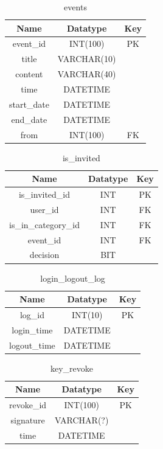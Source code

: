 \begin{table}[!ht]
\caption{events}
\centering
\begin{tabular}{c c c}
\hline\hline
Name                    & Datatype    & Key \\
\hline
event\_id               & INT(100)     & PK  \\
title                   & VARCHAR(10)  &     \\
content                 & VARCHAR(40)  &     \\
time           & DATETIME     & \\
start\_date              & DATETIME     & \\
end\_date                & DATETIME     & \\
from                    & INT(100)     & FK  \\
\hline
\end{tabular}
\label{table:nonlin}
\end{table}

\begin{table}[!ht]
\caption{is\_invited}
\centering
\begin{tabular}{c c c}
\hline\hline
Name                    & Datatype    & Key \\
\hline
is\_invited\_id         & INT         & PK  \\
user\_id                & INT         & FK     \\
is\_in\_category\_id    & INT         & FK \\
event\_id               & INT         & FK \\
decision                & BIT         & \\
\hline
\end{tabular}
\label{table:nonlin}
\end{table}

\begin{table}[!ht]
\caption{login\_logout\_log}
\centering
\begin{tabular}{c c c}
\hline\hline
Name               & Datatype    & Key \\
\hline
log\_id            & INT(10)     & PK  \\
login\_time        & DATETIME    &     \\
logout\_time       & DATETIME    &     \\
\hline
\end{tabular}
\label{table:nonlin}
\end{table}

\begin{table}[!ht]
\caption{key\_revoke}
\centering
\begin{tabular}{c c c}
\hline\hline
Name               & Datatype    & Key \\
\hline
revoke\_id         & INT(100)     & PK  \\
signature          & VARCHAR(?)   &     \\
time               & DATETIME     &     \\
\hline
\end{tabular}
\label{table:nonlin}
\end{table}

